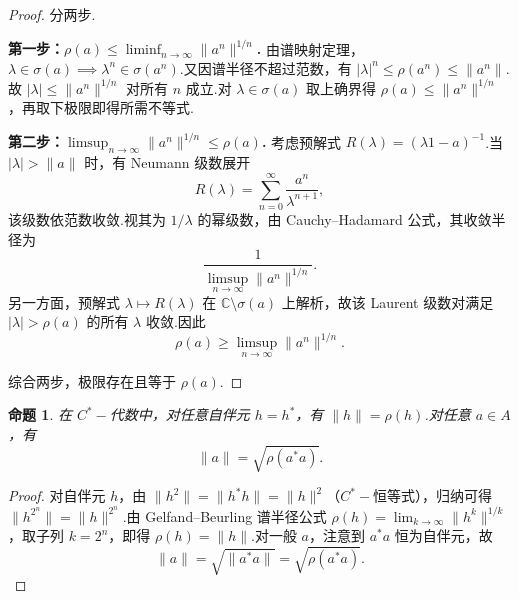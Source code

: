 \documentclass[math-font=lm, text-font=lm, math-style=TeX]{sjtureport}
\newtheorem{proposition}[theorem]{命题}
\theoremstyle{plain}
\newtheorem*{proof}{证明}
\theoremstyle{plain}
\begin{document}
\begin{proof}
    分两步.

    \textbf{第一步：$\rho(a) \le \liminf_{n \to \infty} \|a^n\|^{1/n}$.}
    由谱映射定理，$\lambda \in \sigma(a) \implies \lambda^n \in \sigma(a^n)$.又因谱半径不超过范数，有 $|\lambda|^n \le \rho(a^n) \le \|a^n\|$.故 $|\lambda| \le \|a^n\|^{1/n}$ 对所有 $n$ 成立.对 $\lambda \in \sigma(a)$ 取上确界得 $\rho(a) \le \|a^n\|^{1/n}$，再取下极限即得所需不等式.

    \textbf{第二步：$\limsup_{n \to \infty} \|a^n\|^{1/n} \le \rho(a)$.}
    考虑预解式 $R(\lambda) = (\lambda 1 - a)^{-1}$.当 $|\lambda| > \|a\|$ 时，有 Neumann 级数展开
    \begin{equation*}
        R(\lambda) = \sum_{n=0}^{\infty} \frac{a^n}{\lambda^{n+1}},
    \end{equation*}
    该级数依范数收敛.视其为 $1/\lambda$ 的幂级数，由 Cauchy--Hadamard 公式，其收敛半径为
    \begin{equation*}
        \frac{1}{\limsup_{n \to \infty} \|a^n\|^{1/n}}.
    \end{equation*}
    另一方面，预解式 $\lambda \mapsto R(\lambda)$ 在 $\mathbb{C} \setminus \sigma(a)$ 上解析，故该 Laurent 级数对满足 $|\lambda| > \rho(a)$ 的所有 $\lambda$ 收敛.因此
    \begin{equation*}
        \rho(a) \ge \limsup_{n \to \infty} \|a^n\|^{1/n}.
    \end{equation*}

    综合两步，极限存在且等于 $\rho(a)$.
\end{proof}

\begin{proposition}\label{prop:norm-spectral}
    在 $C^*-\!$代数中，对任意自伴元 $h = h^*$，有 $\|h\| = \rho(h)$.对任意 $a \in A$，有
    \begin{equation}\label{eq:spectral-radius}
        \|a\| = \sqrt{\rho(a^*a)}.
    \end{equation}
\end{proposition}

\begin{proof}
    对自伴元 $h$，由 $\|h^2\| = \|h^*h\| = \|h\|^2$（$C^*-\!$恒等式），归纳可得 $\|h^{2^n}\| = \|h\|^{2^n}$.由 Gelfand--Beurling 谱半径公式 $\rho(h) = \lim_{k \to \infty} \|h^k\|^{1/k}$，取子列 $k = 2^n$，即得 $\rho(h) = \|h\|$.对一般 $a$，注意到 $a^*a$ 恒为自伴元，故
    \begin{equation}
        \|a\| = \sqrt{\|a^*a\|} = \sqrt{\rho(a^*a)}.
    \end{equation}
\end{proof}
\end{document}

